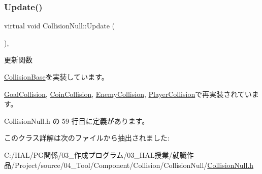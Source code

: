 \subsubsection{\texorpdfstring{Update()}{Update()}}
{\footnotesize\ttfamily virtual void Collision\+Null\+::\+Update (\begin{DoxyParamCaption}{ }\end{DoxyParamCaption})\hspace{0.3cm}{\ttfamily [inline]}, {\ttfamily [virtual]}}



更新関数 



\mbox{\hyperlink{class_collision_base_a0f967cf5de4178ee99f434c3ff4f16fd}{Collision\+Base}}を実装しています。



\mbox{\hyperlink{class_goal_collision_a1e3995dc2f5ba2678580d06699ca6936}{Goal\+Collision}}, \mbox{\hyperlink{class_coin_collision_a981fd9b1b8c688a757a456a56d80501b}{Coin\+Collision}}, \mbox{\hyperlink{class_enemy_collision_ab54133504d867c6d2070d2f3854a0aaf}{Enemy\+Collision}}, \mbox{\hyperlink{class_player_collision_a09f97f220903f5724a3af6b97af3a336}{Player\+Collision}}で再実装されています。



 Collision\+Null.\+h の 59 行目に定義があります。



このクラス詳解は次のファイルから抽出されました\+:\begin{DoxyCompactItemize}
\item 
C\+:/\+H\+A\+L/\+P\+G関係/03\+\_\+作成プログラム/03\+\_\+\+H\+A\+L授業/就職作品/\+Project/source/04\+\_\+\+Tool/\+Component/\+Collision/\+Collision\+Null/\mbox{\hyperlink{_collision_null_8h}{Collision\+Null.\+h}}\end{DoxyCompactItemize}

